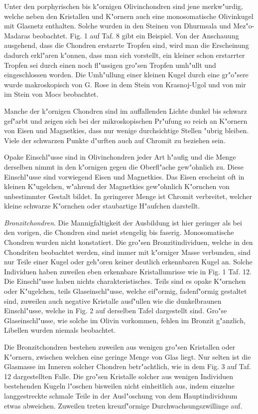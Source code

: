 \documentclass[a4paper, 11pt, oneside, polutonikogreek, german]{article}
\begin{document}
Unter den porphyrischen bis k"ornigen Olivinchondren sind jene merkw"urdig, welche neben den Kristallen und K"ornern auch eine monosomatische Olivinkugel mit Glasnetz enthalten. Solche wurden in den Steinen von Dhurmsala und Mez"o-Madaras beobachtet. Fig. 1 auf Taf. 8 gibt ein Beispiel. Von der Anschauung ausgehend, dass die Chondren erstarrte Tropfen sind, wird man die Erscheinung dadurch erkl"aren k"onnen, dass man sich vorstellt, ein kleiner schon erstarrter Tropfen sei durch einen noch fl"ussigen gro"sen Tropfen umh"ullt und eingeschlossen worden. Die Umh"ullung einer kleinen Kugel durch eine gr"o"sere wurde makroskopisch von G. Rose in dem Stein von Krasnoj-Ugol und von mir im Stein von Mocs beobachtet.

Manche der k"ornigen Chondren sind im auffallenden Lichte dunkel bis schwarz gef"arbt und zeigen sich bei der mikroskopischen Pr"ufung so reich an K"ornern von Eisen und Magnetkies, dass nur wenige durchsichtige Stellen "ubrig bleiben. Viele der schwarzen Punkte d"urften auch auf Chromit zu beziehen sein.

Opake Einschl"usse sind in Olivinchondren jeder Art h"aufig und die Menge derselben nimmt in den k"ornigen gegen die Oberfl"ache gew"ohnlich zu. Diese Einschl"usse sind vorwiegend Eisen und Magnetkies. Das Eisen erscheint oft in kleinen K"ugelchen, w"ahrend der Magnetkies gew"ohnlich K"ornchen von unbestimmter Gestalt bildet. In geringerer Menge ist Chromit verbreitet, welcher kleine schwarze K"ornchen oder staubartige H"aufchen darstellt.

\emph{Bronzitchondren}. Die Mannigfaltigkeit der Ausbildung ist hier geringer als bei den vorigen, die Chondren sind meist stengelig bis faserig. Monosomatische Chondren wurden nicht konstatiert. Die gro"sen Bronzitindividuen, welche in den Chondriten beobachtet werden, sind immer mit k"orniger Masse verbunden, sind nur Teile einer Kugel oder geh"oren keiner deutlich erkennbaren Kugel an. Solche Individuen haben zuweilen eben erkennbare Kristallumrisse wie in Fig. 1 Taf. 12. Die Einschl"usse haben nichts charakteristisches. Teils sind es opake K"ornchen oder K"ugelchen, teils Glaseinschl"usse, welche eif"ormig, fadenf"ormig gestaltet sind, zuweilen auch negative Kristalle ausf"ullen wie die dunkelbraunen Einschl"usse, welche in Fig. 2 auf derselben Tafel dargestellt sind. Gro"se Glaseinschl"usse, wie solche im Olivin vorkommen, fehlen im Bronzit g"anzlich, Libellen wurden niemals beobachtet.

Die Bronzitchondren bestehen zuweilen aus wenigen gro"sen Kristallen oder K"ornern, zwischen welchen eine geringe Menge von Glas liegt. Nur selten ist die Glasmasse im Inneren solcher Chondren betr"achtlich, wie in dem Fig. 3 auf Taf. 12 dargestellten Falle. Die gro"sen Kristalle solcher aus wenigen Individuen bestehenden Kugeln l"oschen bisweilen nicht einheitlich aus, indem einzelne langgestreckte schmale Teile in der Ausl"oschung von dem Hauptindividuum etwas abweichen. Zuweilen treten kreuzf"ormige Durchwachsungszwillinge auf.
\end{document}
